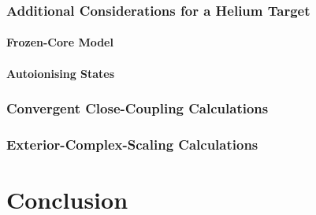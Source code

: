 \documentclass[draft]{article}
\begin{document}
\subsubsection{Additional Considerations for a Helium Target}
\label{sec:e-he-target}

\paragraph{Frozen-Core Model}
\label{sec:e-he-frozen-core}

\paragraph{Autoionising States}
\label{sec:e-he-autoionising}

\subsubsection{Convergent Close-Coupling Calculations}
\label{sec:e-he-ccc-calculations}

\subsubsection{Exterior-Complex-Scaling Calculations}
\label{sec:e-he-ecs-calculations}

\section{Conclusion}
\label{sec:conclusion}

\clearpage



\clearpage




\end{document}
